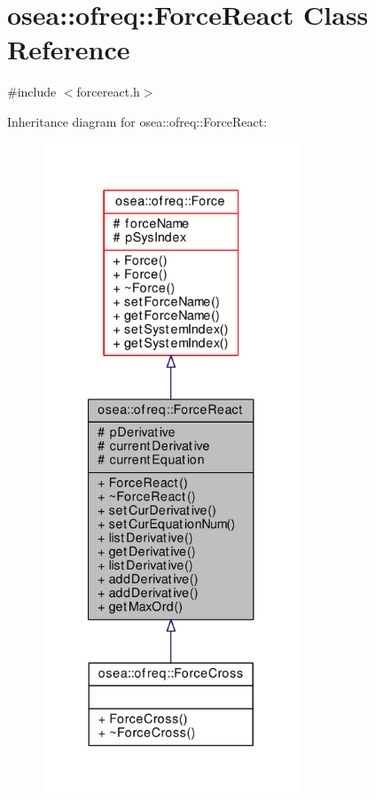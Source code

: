 \hypertarget{classosea_1_1ofreq_1_1_force_react}{\section{osea\-:\-:ofreq\-:\-:Force\-React Class Reference}
\label{classosea_1_1ofreq_1_1_force_react}
}


{\ttfamily \#include $<$forcereact.\-h$>$}



Inheritance diagram for osea\-:\-:ofreq\-:\-:Force\-React\-:
\nopagebreak
\begin{figure}[H]
\begin{center}
\leavevmode
\includegraphics[height=550pt]{classosea_1_1ofreq_1_1_force_react__inherit__graph}
\end{center}
\end{figure}
